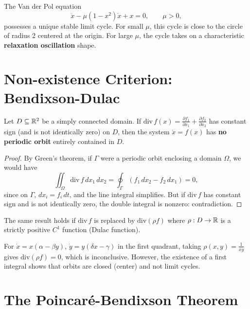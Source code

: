 \begin{example}
The Van der Pol equation
\[
    \ddot{x} - \mu(1 - x^2)\dot{x} + x = 0, \qquad \mu > 0,
\]
possesses a unique stable limit cycle. For small $\mu$, this cycle is close
to the circle of radius 2 centered at the origin. For large $\mu$, the cycle
takes on a characteristic \textbf{relaxation oscillation} shape.
\end{example}

\section{Non-existence Criterion: Bendixson-Dulac}

\begin{theorem}
\label{thm:bendixson}
Let $D \subseteq \mathbb{R}^2$ be a simply connected domain. If
$\mathrm{div}\, f(x) = \frac{\partial f_1}{\partial x_1} + \frac{\partial f_2}{\partial x_2}$
has constant sign (and is not identically zero) on $D$, then the system
$\dot{x} = f(x)$ has \textbf{no periodic orbit} entirely contained in $D$.
\end{theorem}

\begin{proof}
By Green's theorem, if $\Gamma$ were a periodic orbit enclosing a domain
$\Omega$, we would have
\[
    \iint_\Omega \mathrm{div}\, f\, dx_1\, dx_2 =
    \oint_\Gamma (f_1\, dx_2 - f_2\, dx_1) = 0,
\]
since on $\Gamma$, $dx_i = f_i\, dt$, and the line integral simplifies.
But if $\mathrm{div}\, f$ has constant sign and is not identically zero, the
double integral is nonzero: contradiction.
\end{proof}

\begin{theorem}
The same result holds if $\mathrm{div}\, f$ is replaced by
$\mathrm{div}(\rho f)$ where $\rho : D \to \mathbb{R}$ is a strictly positive
$C^1$ function (Dulac function).
\end{theorem}

\begin{example}
For $\dot{x} = x(\alpha - \beta y)$, $\dot{y} = y(\delta x - \gamma)$ in the
first quadrant, taking $\rho(x,y) = \frac{1}{xy}$ gives
$\mathrm{div}(\rho f) = 0$, which is inconclusive. However, the existence
of a first integral shows that orbits are closed (center) and not limit cycles.
\end{example}

\section{The Poincar\'e-Bendixson Theorem}

